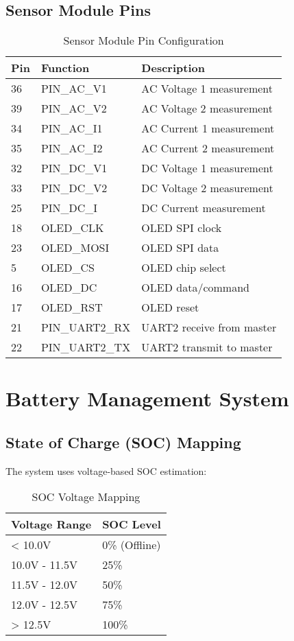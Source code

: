 \documentclass[11pt,a4paper]{article}
\begin{document}
\subsection{Sensor Module Pins}

\begin{table}[H]
\centering
\begin{tabular}{@{}lll@{}}
\toprule
Pin & Function & Description \\ \midrule
36 & PIN\_AC\_V1 & AC Voltage 1 measurement \\
39 & PIN\_AC\_V2 & AC Voltage 2 measurement \\
34 & PIN\_AC\_I1 & AC Current 1 measurement \\
35 & PIN\_AC\_I2 & AC Current 2 measurement \\
32 & PIN\_DC\_V1 & DC Voltage 1 measurement \\
33 & PIN\_DC\_V2 & DC Voltage 2 measurement \\
25 & PIN\_DC\_I & DC Current measurement \\
18 & OLED\_CLK & OLED SPI clock \\
23 & OLED\_MOSI & OLED SPI data \\
5 & OLED\_CS & OLED chip select \\
16 & OLED\_DC & OLED data/command \\
17 & OLED\_RST & OLED reset \\
21 & PIN\_UART2\_RX & UART2 receive from master \\
22 & PIN\_UART2\_TX & UART2 transmit to master \\ \bottomrule
\end{tabular}
\caption{Sensor Module Pin Configuration}
\end{table}

\section{Battery Management System}

\subsection{State of Charge (SOC) Mapping}

The system uses voltage-based SOC estimation:

\begin{table}[H]
\centering
\begin{tabular}{@{}ll@{}}
\toprule
Voltage Range & SOC Level \\ \midrule
< 10.0V & 0\% (Offline) \\
10.0V - 11.5V & 25\% \\
11.5V - 12.0V & 50\% \\
12.0V - 12.5V & 75\% \\
> 12.5V & 100\% \\ \bottomrule
\end{tabular}
\caption{SOC Voltage Mapping}
\end{table}
\end{document}
